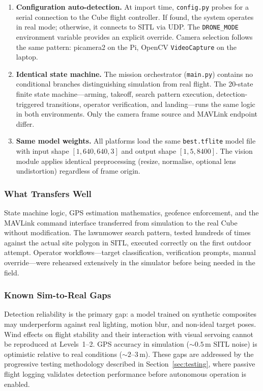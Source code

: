 \begin{enumerate}
    \item \textbf{Configuration auto-detection.} At import time, \texttt{config.py} probes for a serial connection to the Cube flight controller. If found, the system operates in real mode; otherwise, it connects to SITL via UDP. The \texttt{DRONE\_MODE} environment variable provides an explicit override. Camera selection follows the same pattern: picamera2 on the Pi, OpenCV \texttt{VideoCapture} on the laptop.

    \item \textbf{Identical state machine.} The mission orchestrator (\texttt{main.py}) contains no conditional branches distinguishing simulation from real flight. The 20-state finite state machine---arming, takeoff, search pattern execution, detection-triggered transitions, operator verification, and landing---runs the same logic in both environments. Only the camera frame source and MAVLink endpoint differ.

    \item \textbf{Same model weights.} All platforms load the same \texttt{best.tflite} model file with input shape $[1, 640, 640, 3]$ and output shape $[1, 5, 8400]$. The vision module applies identical preprocessing (resize, normalise, optional lens undistortion) regardless of frame origin.
\end{enumerate}

\subsubsection{What Transfers Well}

State machine logic, GPS estimation mathematics, geofence enforcement, and the MAVLink command interface transferred from simulation to the real Cube without modification. The lawnmower search pattern, tested hundreds of times against the actual site polygon in SITL, executed correctly on the first outdoor attempt. Operator workflows---target classification, verification prompts, manual override---were rehearsed extensively in the simulator before being needed in the field.

\subsubsection{Known Sim-to-Real Gaps}

Detection reliability is the primary gap: a model trained on synthetic composites may underperform against real lighting, motion blur, and non-ideal target poses. Wind effects on flight stability and their interaction with visual servoing cannot be reproduced at Levels~1--2. GPS accuracy in simulation (${\sim}0.5$\,m SITL noise) is optimistic relative to real conditions (${\sim}2$--3\,m). These gaps are addressed by the progressive testing methodology described in Section~\ref{sec:testing}, where passive flight logging validates detection performance before autonomous operation is enabled.

